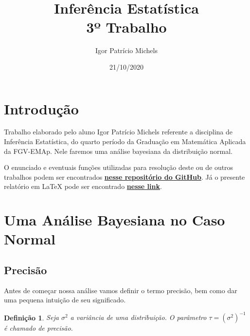 \documentclass{article}
\title{Inferência Estatística \\ 3º Trabalho}
\author{Igor Patrício Michels}
\date{21/10/2020}
\newtheorem{definition}{Definição}
\begin{document}
	
	\maketitle
	
	\section*{Introdução}
	
	Trabalho elaborado pelo aluno Igor Patrício Michels referente a disciplina de Inferência Estatística, do quarto período da Graduação em Matemática Aplicada da FGV-EMAp. Nele faremos uma análise bayesiana da distribuição normal.
	
	O enunciado e eventuais funções utilizadas para resolução deste ou de outros trabalhos podem ser encontrados \href{https://github.com/IgorMichels/Statistical_Inference}{\textbf{nesse repositório do GitHub}}. Já o presente relatório em \LaTeX{} pode ser encontrado \href{https://www.overleaf.com/read/sdfnbcnthrms}{\textbf{nesse link}}.
	
	\section*{Uma Análise Bayesiana no Caso Normal}
	
	\subsection*{Precisão}
	
	Antes de começar nossa análise vamos definir o termo precisão, bem como dar uma pequena intuição de seu significado.
	
	\begin{definition}
		Seja $\sigma^2$ a variância de uma distribuição. O parâmetro $\tau = \left(\sigma^2\right)^{-1}$ é chamado de precisão.
	\end{definition}
	
\end{document}
